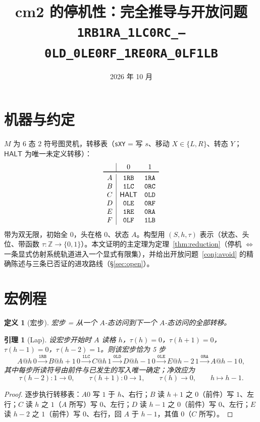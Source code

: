 \documentclass[11pt]{ctexart}
\title{\bfseries cm2 的停机性：完全推导与开放问题\\ \large \texttt{1RB1RA\_1LC0RC\_---0LD\_0LE0RF\_1RE0RA\_0LF1LB}}
\author{}
\date{2026 年 10 月}
\newtheorem{lemma}[theorem]{引理}
\newtheorem{definition}[theorem]{定义}
\newcommand{\HALT}{\textsf{HALT}}
\begin{document}
\maketitle

\section{机器与约定}

$M$ 为 6 态 2 符号图灵机，转移表（\texttt{sXY} = 写 $s$、移动 $X\in\{L,R\}$、转态 $Y$；$\HALT$ 为唯一未定义转移）：
\[
\begin{array}{c|cc} & 0 & 1\\\toprule
A & \texttt{1RB} & \texttt{1RA}\\
B & \texttt{1LC} & \texttt{0RC}\\
C & \HALT & \texttt{0LD}\\
D & \texttt{0LE} & \texttt{0RF}\\
E & \texttt{1RE} & \texttt{0RA}\\
F & \texttt{0LF} & \texttt{1LB}
\end{array}
\]
带为双无限，初始全 0，头在格 $0$、状态 $A$。构型用 $(S,h,\tau)$ 表示（状态、头位、带函数 $\tau:\mathbb Z\to\{0,1\}$）。本文证明的主定理为定理~\ref{thm:reduction}（停机 $\iff$ 一条显式仿射系统轨道进入一个显式有限集），并给出开放问题~\ref{conj:avoid} 的精确陈述与三条已否证的进攻路线（\S\ref{sec:open}）。

\section{宏例程}

\begin{definition}[宏步]
宏步 = 从一个 $A$-态访问到下一个 $A$-态访问的全部转移。
\end{definition}

\begin{lemma}[Lap]\label{lem:lap}
设宏步开始时 $A$ 读格 $h$，$\tau(h)=0$，$\tau(h{+}1)=0$，$\tau(h{-}1)=0$，$\tau(h{-}2)=1$。则该宏步恰为 5 步
\[
A@h\,0 \xrightarrow{\texttt{1RB}} B@h{+}1\,0 \xrightarrow{\texttt{1LC}} C@h\,1 \xrightarrow{\texttt{0LD}} D@h{-}1\,0 \xrightarrow{\texttt{0LE}} E@h{-}2\,1 \xrightarrow{\texttt{0RA}} A@h{-}1\,0,
\]
其中每步所读符号由前件与已发生的写入唯一确定；净效应为
\[
\tau(h{-}2)\colon 1\to 0,\qquad \tau(h{+}1)\colon 0\to 1,\qquad \tau(h)\to 0,\qquad h\mapsto h-1 .
\]
\end{lemma}
\begin{proof}
逐步执行转移表：$A0$ 写 $1$ 于 $h$、右行；$B$ 读 $h{+}1$ 之 $0$（前件）写 $1$、左行；$C$ 读 $h$ 之 $1$（$A$ 所写）写 $0$、左行；$D$ 读 $h{-}1$ 之 $0$（前件）写 $0$、左行；$E$ 读 $h{-}2$ 之 $1$（前件）写 $0$、右行，回 $A$ 于 $h{-}1$，其值 $0$（$C$ 所写）。
\end{proof}
\end{document}
